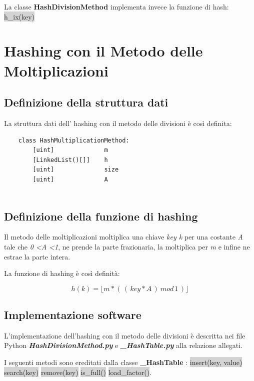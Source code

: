 \documentclass{article}
\begin{document}
			La classe \textbf{HashDivisionMethod} implementa invece la funzione di hash:
			\newline
			\colorbox{lightgray}{h\_ix(key)}
			
	\newpage
	\section{Hashing con il Metodo delle Moltiplicazioni}
	
		\subsection{Definizione della struttura dati}
			La struttura dati dell' hashing con il metodo delle divisioni è così definita:
		
			\begin{lstlisting}
    class HashMultiplicationMethod:
        [uint]              m
        [LinkedList()[]]    h
        [uint]              size
        [uint]              A
        
			\end{lstlisting}
		
		\subsection{Definizione della funzione di hashing}
			Il metodo delle moltiplicazioni moltiplica una chiave \textit{key k} per una costante \textit{A} tale che \textit{0 \textless  A \textless  1}, ne prende la parte frazionaria, la moltiplica per \textit{m} e infine ne estrae la parte intera.
			
			La funzione di hashing è così definità:
		
			\[ h(k) = \lfloor m * (\,(\, key * A \, ) \ mod \, 1 \,) \rfloor \]
		
		
		\subsection{Implementazione software}
		L'implementazione dell'hashing con il metodo delle divisioni è descritta nei file Python \textbf{\textit{HashDivisionMethod.py}} e \textbf{\textit{\_HashTable.py}} alla relazione allegati.
		
		I seguenti metodi sono ereditati dalla classe \textbf{\_HashTable} :
		\newline
		\colorbox{lightgray}{insert(key, value)} \colorbox{lightgray}{search(key)} \colorbox{lightgray}{remove(key)} \colorbox{lightgray}{is\_full()} \colorbox{lightgray}{load\_factor()}.
		
\end{document}
